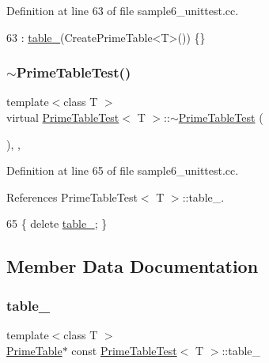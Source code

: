Definition at line 63 of file sample6\+\_\+unittest.\+cc.


\begin{DoxyCode}
63 : \hyperlink{classPrimeTableTest_a86da90fc6d5cef6386d0cd8fb52b4046}{table\_}(CreatePrimeTable<T>()) \{\}
\end{DoxyCode}
\mbox{\label{classPrimeTableTest_a4fb27ce277675d58ea3f8db99e3bb2b4}} 
\subsubsection{\texorpdfstring{$\sim$\+Prime\+Table\+Test()}{~PrimeTableTest()}}
{\footnotesize\ttfamily template$<$class T $>$ \\
virtual \hyperlink{classPrimeTableTest}{Prime\+Table\+Test}$<$ T $>$\+::$\sim$\hyperlink{classPrimeTableTest}{Prime\+Table\+Test} (\begin{DoxyParamCaption}{ }\end{DoxyParamCaption})\hspace{0.3cm}{\ttfamily [inline]}, {\ttfamily [protected]}, {\ttfamily [virtual]}}



Definition at line 65 of file sample6\+\_\+unittest.\+cc.



References Prime\+Table\+Test$<$ T $>$\+::table\+\_\+.


\begin{DoxyCode}
65 \{ \textcolor{keyword}{delete} \hyperlink{classPrimeTableTest_a86da90fc6d5cef6386d0cd8fb52b4046}{table\_}; \}
\end{DoxyCode}


\subsection{Member Data Documentation}
\mbox{\label{classPrimeTableTest_a86da90fc6d5cef6386d0cd8fb52b4046}} 
\subsubsection{\texorpdfstring{table\+\_\+}{table\_}}
{\footnotesize\ttfamily template$<$class T $>$ \\
\hyperlink{classPrimeTable}{Prime\+Table}$\ast$ const \hyperlink{classPrimeTableTest}{Prime\+Table\+Test}$<$ T $>$\+::table\+\_\+\hspace{0.3cm}{\ttfamily [protected]}}



